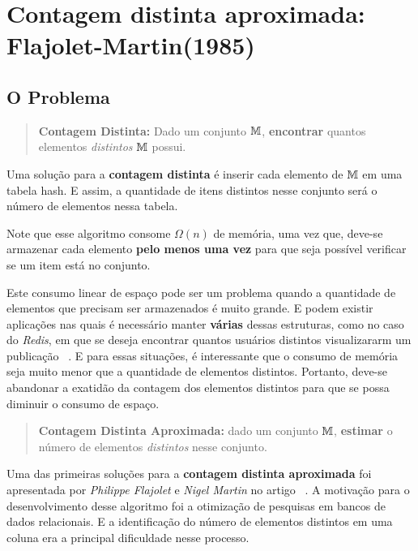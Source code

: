 \chapter{Contagem distinta aproximada: Flajolet-Martin(1985)}
\label{lab:flajolet-martin}

\section{O Problema}

\begin{quote}
  \textbf{Contagem Distinta:} Dado um conjunto $\mathbb{M}$, \textbf{encontrar} quantos elementos \textit{distintos}
  $\mathbb{M}$ possui.
\end{quote}

Uma solução para a \textbf{contagem distinta} é inserir cada elemento de $\mathbb{M}$ em uma tabela hash. 
E assim, a quantidade de itens distintos nesse conjunto será o número de elementos nessa tabela.

Note que esse algoritmo consome $\Omega(n)$ de memória, uma vez que, deve-se armazenar cada elemento 
\textbf{pelo menos uma vez} para que seja possível verificar se um item está no conjunto.

Este consumo linear de espaço pode ser um problema quando a quantidade de elementos que precisam ser armazenados é muito 
grande. E podem existir aplicações nas quais é necessário manter \textbf{várias} dessas estruturas, como no caso do 
\textit{Redis}, em que se deseja encontrar quantos usuários distintos visualizararm um publicação ~\citep{Redis}. E para 
essas situações, é interessante que o consumo de memória seja muito menor que a quantidade de elementos distintos. 
Portanto, deve-se abandonar a exatidão da contagem dos elementos distintos para que se possa diminuir o consumo de 
espaço.

\begin{quote}
  \textbf{Contagem Distinta Aproximada:} dado um conjunto $\mathbb{M}$, \textbf{estimar} o número de elementos 
  \textit{distintos} nesse conjunto.
\end{quote}

Uma das primeiras soluções para a \textbf{contagem distinta aproximada} foi apresentada por \textit{Philippe Flajolet} e 
\textit{Nigel Martin} no artigo ~\citep{flajolet:martin:85}.
A motivação para o desenvolvimento desse algoritmo foi a otimização de pesquisas em bancos de dados relacionais.
E a identificação do número de elementos distintos em uma coluna era a principal dificuldade nesse processo.

